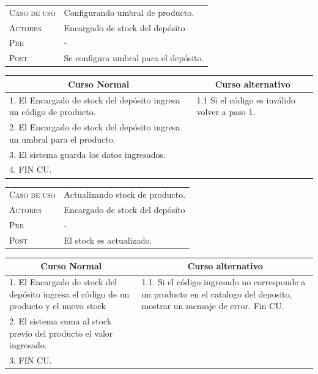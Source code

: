 \begin{tabular}{p{} p{}}
    \textsc{Caso de uso} & Configurando umbral de producto. \\
    \textsc{Actores} & Encargado de stock del depósito \\
    \textsc{Pre} & - \\
    \textsc{Post} & Se configura umbral para el depósito. \\
\end{tabular}

\begin{center}
\begin{tabular}{|p{}|p{}|}
    \hline
    \multicolumn{1}{|c|}{Curso Normal} &
    \multicolumn{1}{|c|}{Curso alternativo} \\
    \hline
    1. El Encargado de stock del depósito ingresa un código de producto. &
    1.1 Si el código es inválido volver a paso 1. \\
    2. El Encargado de stock del depósito ingresa un umbral para el producto. &
    \\
    3. El sistema guarda los datos ingresados. & \\
    4. FIN CU. & \\
    \hline
\end{tabular}
\end{center}

\begin{tabular}{p{} p{}}
    \textsc{Caso de uso} & Actualizando stock de producto. \\
    \textsc{Actores} & Encargado de stock del depósito \\
    \textsc{Pre} & - \\
    \textsc{Post} & El stock es actualizado. \\
\end{tabular}

\begin{center}
\begin{tabular}{|p{}|p{}|}
    \hline
    \multicolumn{1}{|c|}{Curso Normal} &
    \multicolumn{1}{|c|}{Curso alternativo} \\
    \hline
    1. El Encargado de stock del depósito ingresa el código de un producto y el
    nuevo stock & 
    1.1. Si el código ingresado no corresponde a un producto en el catalogo del deposito, mostrar un mensaje de error. Fin CU. \\
    2. El sistema suma al stock previo del producto el valor ingresado. & \\
    3. FIN CU. & \\
    \hline
\end{tabular}
\end{center}

